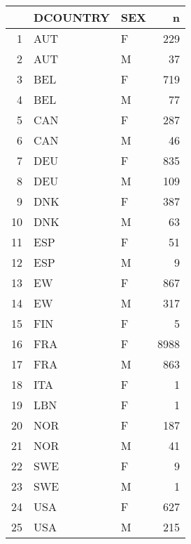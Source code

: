 \begin{table}[ht]
\centering
\begin{tabular}{rllr}
  \hline
 & DCOUNTRY & SEX & n \\ 
  \hline
1 & AUT & F & 229 \\ 
  2 & AUT & M &  37 \\ 
  3 & BEL & F & 719 \\ 
  4 & BEL & M &  77 \\ 
  5 & CAN & F & 287 \\ 
  6 & CAN & M &  46 \\ 
  7 & DEU & F & 835 \\ 
  8 & DEU & M & 109 \\ 
  9 & DNK & F & 387 \\ 
  10 & DNK & M &  63 \\ 
  11 & ESP & F &  51 \\ 
  12 & ESP & M &   9 \\ 
  13 & EW & F & 867 \\ 
  14 & EW & M & 317 \\ 
  15 & FIN & F &   5 \\ 
  16 & FRA & F & 8988 \\ 
  17 & FRA & M & 863 \\ 
  18 & ITA & F &   1 \\ 
  19 & LBN & F &   1 \\ 
  20 & NOR & F & 187 \\ 
  21 & NOR & M &  41 \\ 
  22 & SWE & F &   9 \\ 
  23 & SWE & M &   1 \\ 
  24 & USA & F & 627 \\ 
  25 & USA & M & 215 \\ 
   \hline
\end{tabular}
\end{table}
